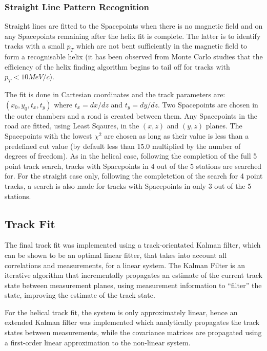     \subsubsection{Straight Line Pattern Recognition}
    \label{subsubsec:StraightLinePatternRecognition}

    Straight lines are fitted to the Spacepoints when there is no magnetic field and on any Spacepoints remaining after the helix fit is complete. The latter is to identify tracks with a small $p_T$ which are not bent sufficiently in the magnetic field to form a recognisable helix (it has been observed from Monte Carlo studies that the efficiency of the helix finding algorithm begins to tail off for tracks with $p_T < 10 MeV/c$).

    The fit is done in Cartesian coordinates and the track parameters are: $(x_0, y_0, t_x, t_y)$ where $t_x = dx/dz$ and $t_y = dy/dz$. Two Spacepoints are chosen in the outer chambers and a road is created between them. Any Spacepoints in the road are fitted, using Least Sqaures, in the $(x,z)$ and $(y,z)$ planes. The Spacepoints with the lowest $\chi^2$ are chosen as long as their value is less than a predefined cut value (by default less than 15.0 multiplied by the number of degrees of freedom). As in the helical case, following the completion of the full 5 point track search, tracks with Spacepoints in 4 out of the 5 stations are searched for. For the straight case only, following the completetion of the search for 4 point tracks, a search is also made for tracks with Spacepoints in only 3 out of the 5 stations. 

   \subsection{Track Fit}
   \label{subsec:FinalTrackFit}
   The final track fit was implemented using a track-orientated Kalman filter\cite{Fruhwirth,Billoir}, which can be shown to be an optimal linear fitter, that takes into account all correlations and measurements, for a linear system. The Kalman Filter is an iterative algorithm that incrementally propagates an estimate of the current track state between measurement planes, using measurement information to ``filter'' the state, improving the estimate of the track state.
   
   For the helical track fit, the system is only approximately linear, hence an extended Kalman filter was implemented which analytically propagates the track states between measurements, while the covariance matrices are propagated using a first-order linear approximation to the non-linear system.

